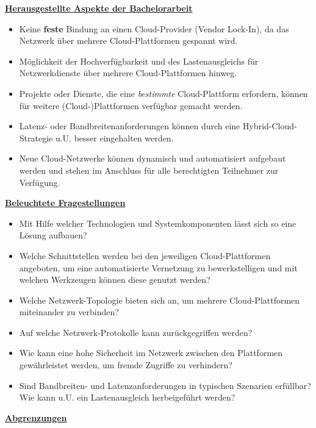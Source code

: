 \textbf{\underline{Herausgestellte Aspekte der Bachelorarbeit}}
\begin{itemize}
    \item Keine \textbf{feste} Bindung an einen Cloud-Provider (\glqq Vendor Lock-In\grqq{}), da das Netzwerk über mehrere Cloud-Plattformen gespannt wird.
    \item Möglichkeit der Hochverfügbarkeit und des Lastenausgleichs für Netzwerkdienste über mehrere Cloud-Plattformen hinweg.
    \item Projekte oder Dienste, die eine \textit{bestimmte} Cloud-Plattform erfordern, können für weitere (Cloud-)Plattformen verfügbar gemacht werden.
    \item Latenz- oder Bandbreitenanforderungen können durch eine Hybrid-Cloud-Strategie u.U. besser eingehalten werden.
    \item Neue Cloud-Netzwerke können dynamisch und automatisiert aufgebaut werden und stehen im Anschluss für alle berechtigten Teilnehmer zur Verfügung.
\end{itemize}

\textbf{\underline{Beleuchtete Fragestellungen}}
\begin{itemize}
    \item Mit Hilfe welcher Technologien und Systemkomponenten lässt sich so eine Lösung aufbauen?
    \item Welche Schnittstellen werden bei den jeweiligen Cloud-Plattformen angeboten, um eine automatisierte Vernetzung zu bewerkstelligen und mit welchen Werkzeugen können diese genutzt werden?
    \item Welche Netzwerk-Topologie bieten sich an, um mehrere Cloud-Plattformen miteinander zu verbinden?
    \item Auf welche Netzwerk-Protokolle kann zurückgegriffen werden?
    \item Wie kann eine hohe Sicherheit im Netzwerk zwischen den Plattformen gewährleistet werden, um fremde Zugriffe zu verhindern?
    \item Sind Bandbreiten- und Latenzanforderungen in typischen Szenarien erfüllbar? Wie kann u.U. ein Lastenausgleich herbeigeführt werden?
\end{itemize}

\textbf{\underline{Abgrenzungen}}\label{abgrenzung}

